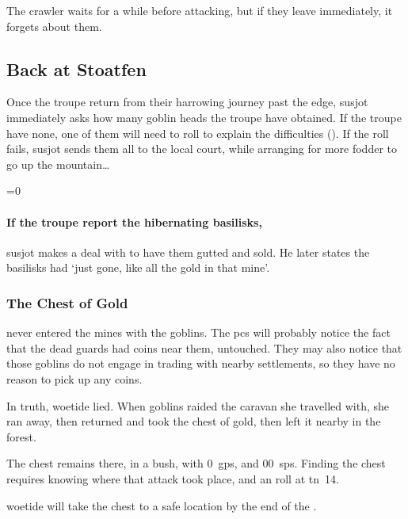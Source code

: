 \begin{multicols}{2}
  The \gls{crawler} waits for a while before attacking, but if they leave immediately, it forgets about them.

  \chitincrawler
\fi

\subsection{Back at Stoatfen }

Once the troupe return from their harrowing journey past the \gls{edge}, \gls{susjot} immediately asks how many goblin heads the troupe have obtained.
If the troupe have none, one of them will need to roll  to explain the difficulties (\tn[8]).
If the roll fails, \gls{susjot} sends them all to the local \gls{court}, while arranging for more \gls{fodder} to go up the mountain\ldots

\ifnum\value{temperature}=0
  \paragraph{If the troupe report the hibernating \glspl{basilisk},}
  \gls{susjot} makes a deal with  to have them gutted and sold.
  He later states the \glspl{basilisk} had `just gone, like all the gold in that mine'.
\fi

\subsubsection{The Chest of Gold}
\label{goldConspiracy}
never entered the mines with the goblins.
The \glspl{pc} will probably notice the fact that the dead \glspl{guard} had \glspl{coin} near them, untouched.
They may also notice that those goblins do not engage in trading with nearby settlements, so they have no reason to pick up any \glspl{coin}.

In truth, \gls{woetide} lied.
When goblins raided the caravan she travelled with, she ran away, then returned and took the chest of gold, then left it nearby in the forest.

The chest remains there, in a bush, with 0~\glspl{gp}, and 
\randomize{}00~\glspl{sp}.
Finding the chest requires knowing where that attack took place, and an  roll at \gls{tn}~14.

\Gls{woetide} will take the chest to a safe location by the end of the .

\end{multicols}
